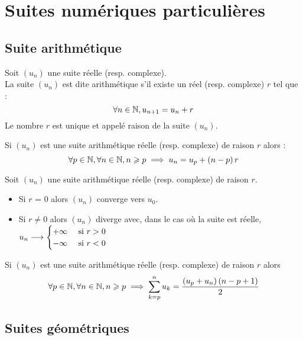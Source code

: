 \chapter{Suites numériques particulières}

\minitoc

\section{Suite arithmétique}
\begin{defi}
    Soit \((u_n)\) une suite réelle (resp. complexe).\\
    La suite \((u_n)\) est dite arithmétique s’il existe un réel (resp. complexe) \(r\) tel que :
    \[\forall n \in \mathbb{N}, u_{n+1} = u_n + r\]
    Le nombre \(r\) est unique et appelé raison de la suite \((u_n)\).
\end{defi}

\begin{defprop}
    Si \((u_n)\) est une suite arithmétique réelle (resp. complexe) de raison \(r\) alors :
    \[\forall p \in \mathbb{N}, \forall n \in \mathbb{N}, n \geqslant p \implies u_n = u_p + \left(n - p\right)r\]
\end{defprop}
\begin{defprop}[Limite]
    Soit \((u_n)\) une suite arithmétique réelle (resp. complexe) de raison \(r\).
    \begin{itemize}
        \item Si \(r\) = 0 alors \((u_n)\) converge vers \(u_0\).
        \item Si \(r \neq 0\) alors \((u_n)\) diverge avec, dans le cas où la suite est réelle, \(u_n \longrightarrow \begin{cases}
            +\infty & \text{ si } r>0\\
            -\infty& \text{ si } r<0
        \end{cases}\)
    \end{itemize}
\end{defprop}

\begin{defprop}
   Si \((u_n)\) est une suite arithmétique réelle (resp. complexe) de raison \(r\) alors
    \[\forall p \in \mathbb{N}, \forall n \in \mathbb{N}, n \geqslant p \implies \sum_{k=p}^n u_k = \frac{\left(u_p + u_n\right)\left(n-p+1\right)}{2}\]
\end{defprop}

\section{Suites géométriques}

